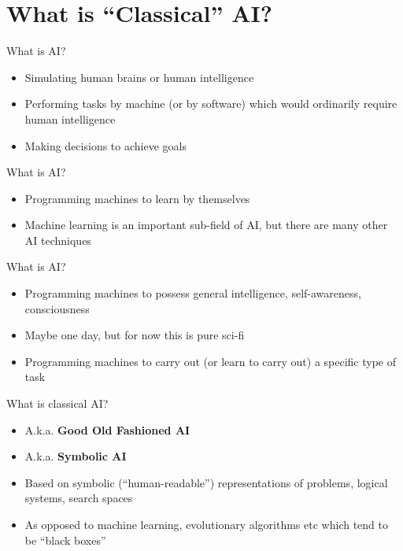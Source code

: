 \part{What is ``Classical'' AI?}
\frame{\partpage}

\begin{frame}{What is AI?}
    \begin{itemize}
        \pause\item[\xmark] Simulating human brains or human intelligence
        \pause\item[\cmark] Performing tasks by machine (or by software) which would ordinarily require human intelligence
        \pause\item[\cmark] Making decisions to achieve goals
    \end{itemize}
\end{frame}

\begin{frame}{What is AI?}
    \begin{itemize}
        \pause\item[\xmark] Programming machines to learn by themselves
        \pause\item[\cmark] Machine learning is an important sub-field of AI, but there are many other AI techniques
    \end{itemize}
\end{frame}

\begin{frame}{What is AI?}
    \begin{itemize}
        \pause\item[\xmark] Programming machines to possess general intelligence, self-awareness, consciousness
        \pause\item[\cmark] Maybe one day, but for now this is pure sci-fi
        \pause\item[\cmark] Programming machines to carry out (or learn to carry out) a specific type of task
    \end{itemize}
\end{frame}

\begin{frame}{What is classical AI?}
    \begin{itemize}
        \pause\item A.k.a. \textbf{Good Old Fashioned AI}
        \pause\item A.k.a. \textbf{Symbolic AI}
        \pause\item Based on symbolic (``human-readable'') representations of problems, logical systems, search spaces
        \pause\item As opposed to machine learning, evolutionary algorithms etc which tend to be ``black boxes''
    \end{itemize}
\end{frame}

